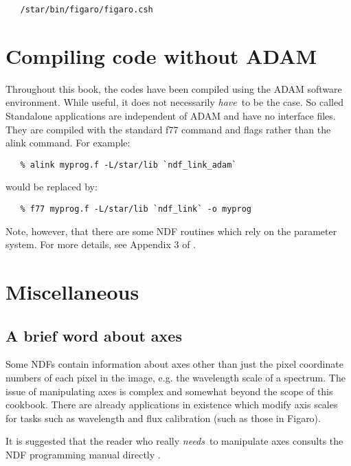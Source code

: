 \begin{verbatim}
   /star/bin/figaro/figaro.csh
\end{verbatim}

\section{Compiling code without ADAM}

Throughout this book, the codes have been compiled using the ADAM software
environment. While useful, it does not necessarily {\em have}\, to be the
case. So called Standalone applications are independent of ADAM and have
no interface files. They are compiled with the standard {\sf f77} command
and flags rather than the {\sf alink} command. For example:

\begin{verbatim}
   % alink myprog.f -L/star/lib `ndf_link_adam`
\end{verbatim}

would be replaced by:

\begin{verbatim}
   % f77 myprog.f -L/star/lib `ndf_link` -o myprog
\end{verbatim}

Note, however, that there are some NDF routines which rely on the parameter
system. For more details, see Appendix 3 of .

\section{Miscellaneous}

\subsection{A brief word about axes}

Some NDFs contain information about axes other than just the pixel
coordinate numbers of each pixel in the image, e.g. the wavelength scale
of a spectrum. The issue of manipulating axes is complex and somewhat
beyond the scope of this cookbook. There are already applications in
existence which modify axis scales for tasks such as wavelength and flux
calibration (such as those in Figaro).

It is suggested that the reader who really {\em needs}\, to manipulate axes
consults the NDF programming manual directly .

